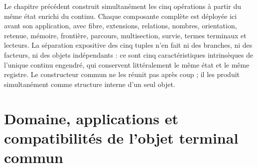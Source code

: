 
Le chapitre précédent construit simultanément les cinq opérations à partir du même état enrichi du continu. Chaque composante complète est déployée ici avant son application, avec fibre, extensions, relations, nombres, orientation, retenue, mémoire, frontière, parcours, multisection, survie, termes terminaux et lecteurs. La séparation expositive des cinq tuples n’en fait ni des branches, ni des facteurs, ni des objets indépendants : ce sont cinq caractéristiques intrinsèques de l’unique continu engendré, qui conservent littéralement le même état et le même registre. Le constructeur commun ne les réunit pas après coup ; il les produit simultanément comme structure interne d’un seul objet.

\section{Domaine, applications et compatibilités de l’objet terminal commun}

